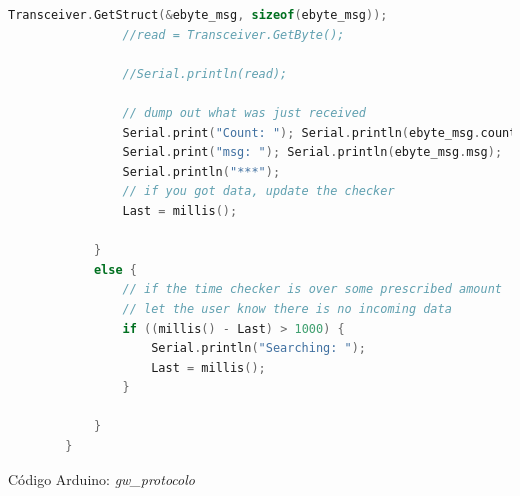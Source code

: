 \documentclass[12pt]{article}
\begin{document}
\begin{lstlisting}[language=C]
				Transceiver.GetStruct(&ebyte_msg, sizeof(ebyte_msg));
				//read = Transceiver.GetByte();
				
				//Serial.println(read);
				
				// dump out what was just received
				Serial.print("Count: "); Serial.println(ebyte_msg.count);
				Serial.print("msg: "); Serial.println(ebyte_msg.msg);
				Serial.println("***");
				// if you got data, update the checker
				Last = millis();
				
			}
			else {
				// if the time checker is over some prescribed amount
				// let the user know there is no incoming data
				if ((millis() - Last) > 1000) {
					Serial.println("Searching: ");
					Last = millis();
				}
				
			}
		}
	\end{lstlisting}
	
	\pagebreak
	
	\noindent Código Arduino: \textit{gw\_protocolo} \\
	
\end{document}
